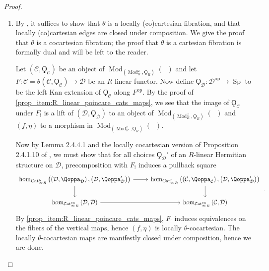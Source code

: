 \documentclass{article}
\DeclareMathOperator{\Cat}{\mathcal{C}at} %
\DeclareMathOperator{\Catex}{\Cat_\infty^{ex}} %
\DeclareMathOperator{\Cath}{Cat^h_\infty} %
\DeclareMathOperator{\Mod}{Mod} %
\DeclareMathOperator{\Spectra}{Sp} %
\newcommand{\op}{\mathrm{op}} %
\theoremstyle{definition}
\newcommand{\Lucy}[1]{\todo[color=cyan]{\linespread{1}\footnotesize L: #1}}
\begin{document}
\begin{proof}
\begin{enumerate}
        \item By \cite[Proposition 2.4.2.8]{HTT}, it suffices to show that $ \theta $ is a locally (co)cartesian fibration, and that locally (co)cartesian edges are closed under composition. 
        We give the proof that $ \theta $ is a cocartesian fibration; the proof that $ \theta $ is a cartesian fibration is formally dual and will be left to the reader. 

        Let $ \left(\mathcal{C}, \Qoppa_{\mathcal{C}}\right) $ be an object of $ \Mod_{\left(\Mod_R^\omega, \Qoppa_R \right)}(\Cath) $ and let $ F \colon \mathcal{C} = \theta \left(\mathcal{C}, \Qoppa_{\mathcal{C}}\right)\to \mathcal{D} $ be an $ R $-linear functor. 
        Now define $ \Qoppa_{\mathcal{D}} \colon \mathcal{D}^\op \to \Spectra $ to be the left Kan extension of $ \Qoppa_{\mathcal{C}} $ along $ F^\op $. 
        By the proof of \ref{prop_item:R_linear_poincare_cats_maps}, we see that the image of $ \Qoppa_{\mathcal{C}} $ under $ F_! $ is a lift of $ \left(\mathcal{D}, \Qoppa_{\mathcal{D}}\right) $ to an object of $ \Mod_{\left(\Mod_R^\omega, \Qoppa_R \right)}(\Cath) $ and $ (f, \eta) $ to a morphism in $ \Mod_{\left(\Mod_R^\omega, \Qoppa_R \right)}(\Cath) $. 

        Now by Lemma 2.4.4.1 and the locally cocartesian version of Proposition 2.4.1.10 of \cite{HTT}, we must show that for all choices $ \Qoppa_{\mathcal{D}}' $ of an $ R $-linear Hermitian structure on $ \mathcal{D} $, precomposition with $ F_! $ induces a pullback square
        \begin{equation}
        \begin{tikzcd}
            \hom_{\Cath_R}\left(\left(\mathcal{D}, \Qoppa_{\mathcal{D}}\right), \left(\mathcal{D}, \Qoppa_{\mathcal{D}}'\right)\right) \ar[d] \ar[r] & \hom_{\Cath_R}\left(\left(\mathcal{C}, \Qoppa_{\mathcal{C}}\right), \left(\mathcal{D}, \Qoppa_{\mathcal{D}}'\right)\right) \ar[d] \\
            \hom_{\Catex_R}\left(\mathcal{D}, \mathcal{D}\right) \ar[r] & \hom_{\Catex_R}\left(\mathcal{C}, \mathcal{D} \right)
        \end{tikzcd}\,.
        \end{equation}
        By \ref{prop_item:R_linear_poincare_cats_maps}, $ F_! $ induces equivalences on the fibers of the vertical maps, hence $ (f, \eta) $ is locally $ \theta $-cocartesian. %
        The locally $ \theta $-cocartesian maps are manifestly closed under composition, hence we are done.        \qedhere
    \end{enumerate}
\end{proof}
\end{document}

